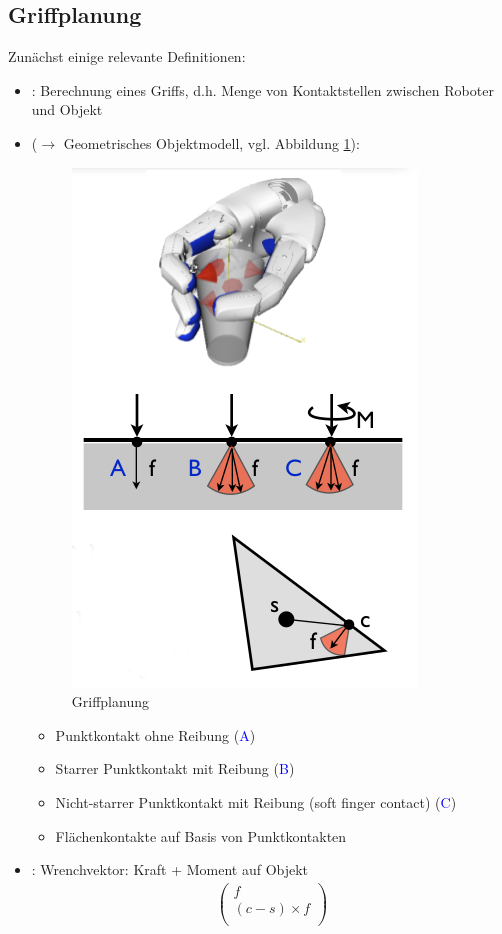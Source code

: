 \subsection{Griffplanung}
Zunächst einige relevante Definitionen:
\begin{itemize}
\item {}: Berechnung eines Griffs, d.h. Menge von Kontaktstellen zwischen Roboter und Objekt
\item {}($\rightarrow$ Geometrisches Objektmodell, vgl. Abbildung \ref{fig:ch04_griff}):
\begin{figure}[ht]\centering 
\includegraphics[width=0.3\linewidth]{figures/ch04_griff.png}
\caption{Griffplanung}
\label{fig:ch04_griff}
\end{figure}
\begin{itemize}
\item Punktkontakt ohne Reibung (\textcolor{blue}{A})
\item Starrer Punktkontakt mit Reibung (\textcolor{blue}{B})
\item Nicht-starrer Punktkontakt mit Reibung (\Gu soft finger contact\Go) (\textcolor{blue}{C})
\item Flächenkontakte auf Basis von Punktkontakten
\end{itemize} 
\item {}: Wrenchvektor: Kraft + Moment auf Objekt
\begin{align*}
\begin{pmatrix}
f\\
(c-s)\times f\\
\end{pmatrix}
\end{align*}
\end{itemize}
